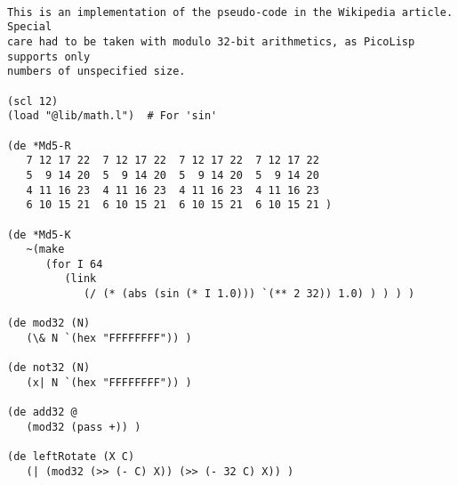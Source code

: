 \begin{verbatim}

This is an implementation of the pseudo-code in the Wikipedia article. Special
care had to be taken with modulo 32-bit arithmetics, as PicoLisp supports only
numbers of unspecified size.

(scl 12)
(load "@lib/math.l")  # For 'sin'

(de *Md5-R
   7 12 17 22  7 12 17 22  7 12 17 22  7 12 17 22
   5  9 14 20  5  9 14 20  5  9 14 20  5  9 14 20
   4 11 16 23  4 11 16 23  4 11 16 23  4 11 16 23
   6 10 15 21  6 10 15 21  6 10 15 21  6 10 15 21 )

(de *Md5-K
   ~(make
      (for I 64
         (link
            (/ (* (abs (sin (* I 1.0))) `(** 2 32)) 1.0) ) ) ) )

(de mod32 (N)
   (\& N `(hex "FFFFFFFF")) )

(de not32 (N)
   (x| N `(hex "FFFFFFFF")) )

(de add32 @
   (mod32 (pass +)) )

(de leftRotate (X C)
   (| (mod32 (>> (- C) X)) (>> (- 32 C) X)) )


\end{verbatim}
